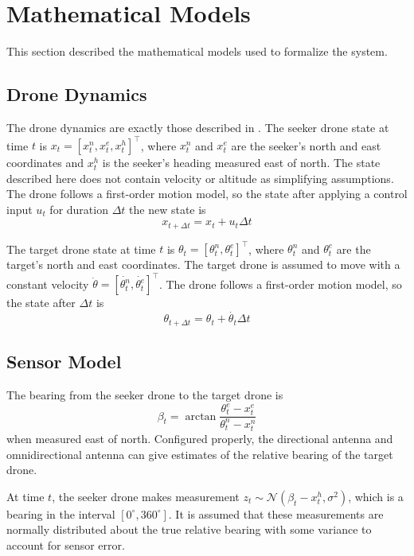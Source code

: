 \documentclass[10pt,twocolumn,letterpaper]{article}
\begin{document}
\section{Mathematical Models}
\label{sec:models}
This section described the mathematical models used to formalize the system.

\subsection{Drone Dynamics}
The drone dynamics are exactly those described in \cite{dronehunter}.
The seeker drone state at time $t$ is $x_t = [x_t^n, x_t^e, x_t^h]^\intercal$, where $x_t^n$ and $x_t^e$ are the seeker's north and east coordinates and $x_t^h$ is the seeker's heading measured east of north.
The state described here does not contain velocity or altitude as simplifying assumptions.
The drone follows a first-order motion model, so the state after applying a control input $u_t$ for duration $\Delta t$ the new state is
\begin{equation}
x_{t + \Delta t} = x_t + u_t\Delta t
\end{equation}

The target drone state at time $t$ is $\theta_t = [\theta_t^n, \theta_t^e]^\intercal$, where $\theta_t^n$ and $\theta_t^e$ are the target's north and east coordinates.
The target drone is assumed to move with a constant velocity $\dot{\theta} = [\dot{\theta_t^n}, \dot{\theta_t^e}]^\intercal$.
The drone follows a first-order motion model, so the state after $\Delta t$ is
\begin{equation}
\theta_{t + \Delta t} = \theta_t + \dot{\theta_t}\Delta t
\label{target_dynamics}
\end{equation}

\subsection{Sensor Model}
The bearing from the seeker drone to the target drone is 
\begin{equation}
\beta_t = \arctan{\frac{\theta_t^e - x_t^e}{\theta_t^n - x_t^n}}
\end{equation}
when measured east of north.
Configured properly, the directional antenna and omnidirectional antenna can give estimates of the relative bearing of the target drone.

At time $t$, the seeker drone makes measurement $z_t \sim \mathcal{N}(\beta_t - x_t^h, \sigma^2)$, which is a bearing in the interval $[0^{\circ}, 360^{\circ}]$.
It is assumed that these measurements are normally distributed about the true relative bearing with some variance to account for sensor error.
\end{document}
